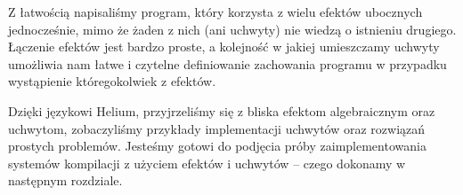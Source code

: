 

Z łatwością napisaliśmy program, który korzysta z wielu efektów ubocznych jednocześnie, mimo że żaden z nich (ani uchwyty) nie wiedzą o istnieniu drugiego. Łączenie efektów jest bardzo proste, a kolejność w jakiej umieszczamy uchwyty umożliwia nam łatwe i czytelne definiowanie zachowania programu w przypadku wystąpienie któregokolwiek z efektów.

Dzięki językowi Helium, przyjrzeliśmy się z bliska efektom algebraicznym oraz uchwytom, zobaczyliśmy przykłady implementacji uchwytów oraz rozwiązań prostych problemów. Jesteśmy gotowi do podjęcia próby zaimplementowania systemów kompilacji z użyciem efektów i uchwytów -- czego dokonamy w następnym rozdziale.

\undef\inl
